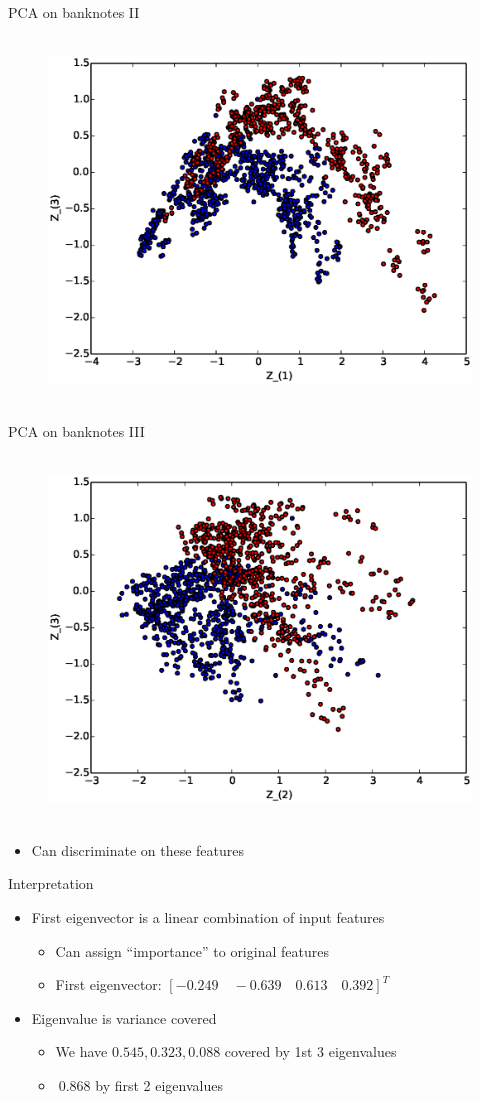 \documentclass{beamer}
\begin{document}
\begin{frame}{PCA on banknotes II}
  \begin{figure}[htp]
\mbox{
\includegraphics[width=0.5\linewidth]{Z13.eps}
}
\end{figure} 
\end{frame}

\begin{frame}{PCA on banknotes III} 
  \begin{figure}[htp]
\mbox{
\includegraphics[width=0.5\linewidth]{Z23.eps}
}
\end{figure} 
\begin{itemize}
 \item Can discriminate on these features 
\end{itemize}

\end{frame}

\begin{frame}{Interpretation} 
\begin{itemize} 
 \item First eigenvector is a linear combination of input features 
 \begin{itemize}
  \item Can assign ``importance'' to original features 
  \item First eigenvector: $[-0.249 \quad -0.639 \quad 0.613 \quad 0.392]^T$
 \end{itemize} 
 \item Eigenvalue is variance covered
 \begin{itemize}
  \item We have $0.545,  0.323,  0.088$ covered by 1st 3 eigenvalues 
  \item $~ 0.868$ by first 2 eigenvalues 
  \end{itemize}
\end{itemize} 
\end{frame}
\end{document}
